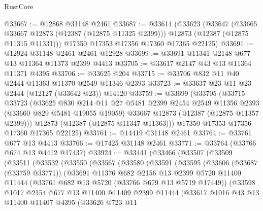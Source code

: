 \begin{lexlean}{RustCore}
\begin{coremodule}
@33667 := @12868 @31148 @2461
@33687 := @33614
    (@33623
      (@33647
        (@33665 @33667 @12873 (@12387 (@12875 @11325 @2399)))
        @12873
        (@12387 (@12875 @11315 @11331)))
      @17350
      @17353
      @17356
      @17360
      @17365
      @22125)
@33691 := @12924 @31148 @2461 @2461 @12928
@33699 := @33691 @11341 @2148 @677 @13 @11364 @11373 @2399 @4413
@33705 := @33617 @2147 @43 @13 @11364 @11371 @4395
@33706 := @33625 @204
@33715 := @33706 @832 @11 @40 @2444 @11363 @11370 @2549 @11346 @2393
@33723 := @33637 @23 @11 @23 @2444 (@12127 (@33642 @23)) @14120
@33759 := @33699
    (@33705
      (@33715
        @33723
        (@33625
          @830
          @214
          @11
          @27
          @5481
          @2399
          @2454
          @2549
          @11356
          @2393
          (@33660 @829 @5481 @19055 @19059)
          @33667
          @12873
          (@12387 (@12875 @11357 @2399)))
        @12873
        (@12387 (@12875 @11347 @11363)))
      @17350
      @17353
      @17356
      @17360
      @17365
      @22125)
@33761 := @14419 @31148 @2461
@33764 := @33761 @677 @13 @4413
@33766 := @17425 @31148 @2461
@33771 := @33764 (@33766 @674 @13 @4412 @17437)
@33924 := @33441
    (@33466
      (@33507
        (@33509
          (@33511
            (@33532
              (@33550
                (@33567
                  (@33580
                    (@33591
                      (@33595
                        (@33606
                          (@33687 (@33759 @33771))
                          (@33691
                            @11376
                            @682
                            @2156
                            @13
                            @2399
                            @5720
                            @11400
                            @11444
                            (@33761 @682 @13 @5720 (@33766 @679 @13 @5719 @17449))
                            (@33598
                              @1017
                              @2154
                              @677
                              @13
                              @11400
                              @11409
                              @2399
                              @11444
                              (@33617
                                @1016
                                @43
                                @13
                                @11400
                                @11407
                                @4395
                                (@33626
                                  @723
                                  @11

\end{coremodule}
\end{lexlean}
